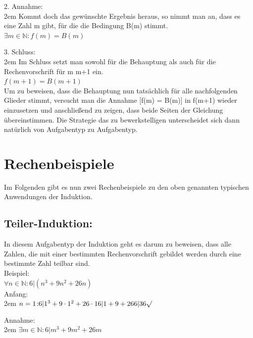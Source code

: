 \documentclass[11pt,final]{scrreprt}
\newcommand{\br} {\medskip\\}
\newcommand{\N} {\mathbb N}
\begin{document}
2. Annahme:\\	
	
\begingroup
\leftskip2em 
Kommt doch das gewünschte Ergebnis heraus, so nimmt man an, dass es eine Zahl m gibt, für die die Bedingung B(m) stimmt. \br
$ \exists m \in \N: f(m) = B(m) $\\
\par	
\endgroup 
		
3. Schluss:\\
			
\begingroup
\leftskip2em 
Im Schluss setzt man sowohl für die Behauptung als auch für die Rechenvorschrift für m m+1 ein.\br
$ f(m+1) = B(m+1) $\br
Um zu beweisen, dass die Behauptung nun tatsächlich für alle nachfolgenden Glieder stimmt, versucht man die Annahme [f(m) = B(m)] in f(m+1) wieder einzusetzen und anschließend zu zeigen, dass beide Seiten der Gleichung übereinstimmen. Die Strategie das zu bewerkstelligen unterscheidet sich dann natürlich von Aufgabentyp zu Aufgabentyp.
\par	
\endgroup 
\bigskip

\section{Rechenbeispiele}

Im Folgenden gibt es nun zwei Rechenbeispiele zu den oben genannten typischen Anwendungen der Induktion.		
		
\subsection{Teiler-Induktion:}
	
In diesem Aufgabentyp der Induktion geht es darum zu beweisen, dass alle Zahlen, die mit einer bestimmten Rechenvorschrift gebildet werden durch eine bestimmte Zahl teilbar sind.\br
Beispiel:\\
$ \forall n \in \N: 6 | (n^3 + 9n^2 + 26n) $\br
Anfang:\\

\begingroup
\leftskip2em 
$n=1 \colon\\
6|1^3+9 \cdot 1^2 + 26 \cdot 1 \\
6|1+9+26\\
6|36 \surd \\
$
\par	
\endgroup 
 

Annahme:\\

\begingroup
\leftskip2em 
$ \exists m \in \N: 6|m^3+9m^2+26m $\\
\par	
\endgroup 
\end{document}
